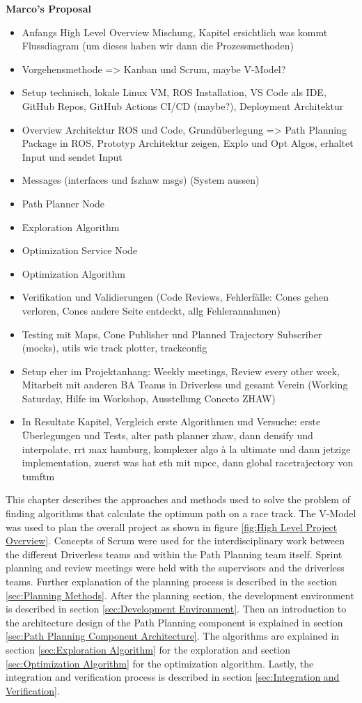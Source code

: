 \textbf{Marco's Proposal}
\begin{itemize}
    \item Anfangs High Level Overview Mischung, Kapitel ersichtlich was kommt Flussdiagram (um dieses haben wir dann die Prozessmethoden)
    \item Vorgehensmethode => Kanban und Scrum, maybe V-Model?
    \item Setup technisch, lokale Linux VM, ROS Installation, VS Code als IDE, GitHub Repos, GitHub Actions CI/CD (maybe?), Deployment Architektur
    \item Overview Architektur ROS und Code, Grundüberlegung => Path Planning Package in ROS, Prototyp Architektur zeigen, Explo und Opt Algos, erhaltet Input und sendet Input
    \item Messages (interfaces und fszhaw msgs) (System aussen)
    \item Path Planner Node
    \item Exploration Algorithm
    \item Optimization Service Node
    \item Optimization Algorithm
    \item Verifikation und Validierungen (Code Reviews, Fehlerfälle: Cones gehen verloren, Cones andere Seite entdeckt, allg Fehlerannahmen)
    \item Testing mit Maps, Cone Publisher und Planned Trajectory Subscriber (mocks), utils wie track plotter, trackconfig
    \item Setup eher im Projektanhang: Weekly meetings, Review every other week, Mitarbeit mit anderen BA Teams in Driverless und gesamt Verein (Working Saturday, Hilfe im Workshop, Ausstellung Conecto ZHAW)
    \item In Resultate Kapitel, Vergleich erste Algorithmen und Versuche: erste Überlegungen und Tests, alter path planner zhaw, dann densify und interpolate, rrt max hamburg, komplexer algo à la ultimate und dann jetzige implementation, zuerst was hat eth mit mpcc, dann global racetrajectory von tumftm
\end{itemize}

This chapter describes the approaches and methods used to solve the problem of finding algorithms that calculate the optimum path on a race track. The V-Model was used to plan the overall project as shown in figure \ref{fig:High Level Project Overview}. Concepts of Scrum were used for the interdisciplinary work between the different Driverless teams and within the Path Planning team itself. Sprint planning and review meetings were held with the supervisors and the driverless teams. Further explanation of the planning process is described in the section \ref{sec:Planning Methods}. After the planning section, the development environment is described in section \ref{sec:Development Environment}. Then an introduction to the architecture design of the Path Planning component is explained in section \ref{sec:Path Planning Component Architecture}. The algorithms are explained in section \ref{sec:Exploration Algorithm} for the exploration and section \ref{sec:Optimization Algorithm} for the optimization algorithm. Lastly, the integration and verification process is described in section \ref{sec:Integration and Verification}.

